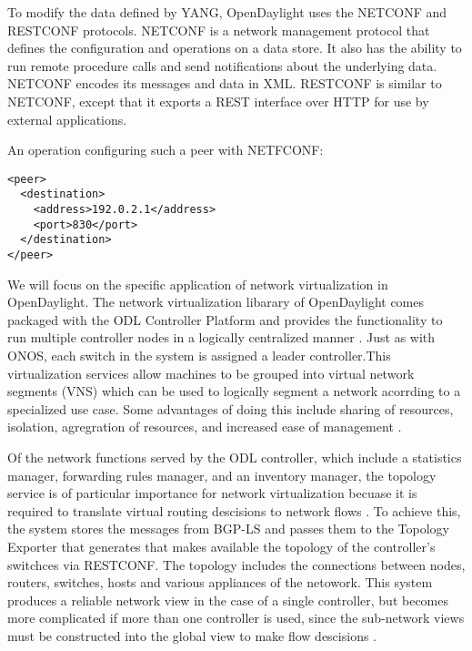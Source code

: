 \documentclass[letterpaper,twocolumn,10pt]{article}
\begin{document}
To modify the data defined by YANG, OpenDaylight uses the NETCONF and RESTCONF protocols. NETCONF is a network management protocol that defines the configuration and operations on a data store. It also has the ability to run remote procedure calls and send notifications about the underlying data. NETCONF encodes its messages and data in XML. RESTCONF is similar to NETCONF, except that it exports a REST interface over HTTP for use by external applications.\cite{enns2011netconf}

An operation configuring such a peer with NETFCONF:\cite{yang}
\begin{lstlisting}
<peer>
  <destination>
    <address>192.0.2.1</address>
    <port>830</port>
  </destination>
</peer>
\end{lstlisting}


We will focus on the specific application of network virtualization in OpenDaylight. The network virtualization libarary of OpenDaylight comes packaged with the ODL Controller Platform and provides the functionality to run multiple controller nodes in a logically centralized manner \cite{ONV:wiki}. Just as with ONOS, each switch in the system is assigned a leader controller.This virtualization services allow machines to be grouped into virtual network segments (VNS) which can be used to logically segment a network acorrding to a specialized use case. Some advantages of doing this include sharing of resources, isolation, agregration of resources, and increased ease of management \cite{jain2013network}.

Of the network functions served by the ODL controller, which include a statistics manager, forwarding rules manager, and an inventory manager, the topology service is of particular importance for network virtualization becuase it is required to translate virtual routing descisions to network flows \cite{jain2013network}. To achieve this, the system stores the messages from BGP-LS and passes them to the Topology Exporter that generates that makes available the topology of the controller's switchces via RESTCONF. The topology includes the connections between nodes, routers, switches, hosts and various appliances of the netowork. This system produces a reliable network view in the case of a single controller, but becomes more complicated if more than one controller is used, since the sub-network views must be constructed into the global view to make flow descisions \cite{bgp:rfc}.

    
\end{document}
